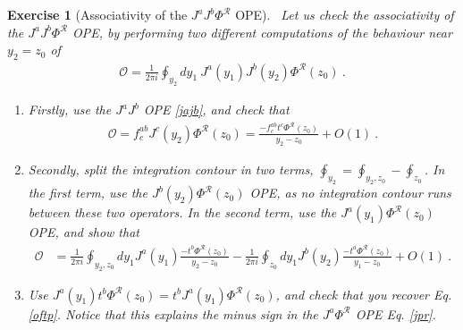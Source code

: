 \documentclass[12pt, a4paper, notitlepage, twoside]{report}
\numberwithin{equation}{section}
\theoremstyle{break}
\newtheorem{exo}{Exercise}[chapter]
\begin{document}
\begin{exo}[Associativity of the $J^aJ^b\Phi^\mathcal{R}$ OPE]
 ~\label{exojjp}
Let us check the associativity of the $J^aJ^b\Phi^\mathcal{R}$ OPE, by performing two different computations of the behaviour near $y_2=z_0$ of 
\begin{align}
\mathcal{O}= \frac{1}{2\pi i} \oint_{y_2}dy_1\ J^a(y_1)J^b(y_2)\Phi^\mathcal{R}(z_0)\ .
\end{align}
\begin{enumerate}
 \item 
Firstly, use the $J^aJ^b$ OPE \eqref{jajb}, and check that
\begin{align}
 \mathcal{O}= f_c^{ab}J^c(y_2)\Phi^\mathcal{R}(z_0) = \frac{-f_c^{ab}t^c\Phi^\mathcal{R}(z_0)}{y_2-z_0} + O(1)\ .
 \label{oftp}
\end{align}

\item
Secondly, split the integration contour in two terms, $\oint_{y_2} = \oint_{y_2,z_0} - \oint_{z_0}$.
In the first term, use the $J^b(y_2)\Phi^\mathcal{R}(z_0)$ OPE, as no integration contour runs between these two operators.
In the second term, use the $J^a(y_1)\Phi^\mathcal{R}(z_0)$ OPE, and show that
\begin{align}
 \mathcal{O}& =\frac{1}{2\pi i} \oint_{y_2,z_0}dy_1 J^a(y_1)\frac{-t^b\Phi^\mathcal{R}(z_0)}{y_2-z_0} - \frac{1}{2\pi i} \oint_{z_0}dy_1 J^b(y_2)\frac{-t^a\Phi^\mathcal{R}(z_0)}{y_1-z_0} +O(1)\ .
\end{align}

\item
Use $J^a(y_1) t^b \Phi^\mathcal{R}(z_0) =t^b J^a(y_1)  \Phi^\mathcal{R}(z_0)$, and check that you recover Eq. \eqref{oftp}.
Notice that this explains the minus sign in the $J^a\Phi^\mathcal{R}$ OPE Eq. \eqref{jpr}.
\end{enumerate}
\end{exo}
\end{document}
